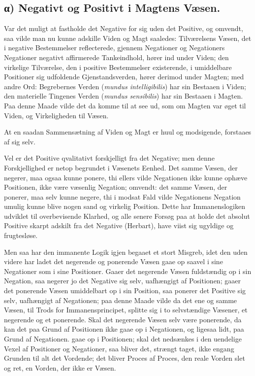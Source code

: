 \documentclass[12pt]{book}
\newcommand{\opage}[1]{\marginnote{\footnotesize\textit{[#1]}}}
\begin{document}
\subsection*{α) Negativt og Positivt i Magtens Væsen.}

Var det muligt at fastholde det Negative for sig uden det
Positive, og omvendt, saa vilde man nu kunne adskille Viden
og Magt saaledes: Tilværelsens Væsen, det i negative
Bestemmelser reflecterede, gjennem Negationer og Negationers
Negationer negativt affirmerede Tankeindhold, hører ind
under Viden; den virkelige Tilværelse, den i positive
Bestemmelser existerende, i umiddelbare Positioner sig
udfoldende Gjenstandsverden, hører derimod under Magten; med
andre Ord: Begrebernes Verden (\textit{mundus intelligibilis})
har sin Bestaaen i Viden; den materielle Tingenes Verden
(\textit{mundus sensibilis}) har sin Bestaaen i Magten. Paa
denne Maade vilde det da komme til at see ud, som om
Magten var øget til Viden, og Virkeligheden til Væsen.

At en saadan Sammensætning af Viden og Magt er
huul og modsigende, forstaaes af sig selv.

Vel er det Positive qvalitativt forskjelligt fra det
Negative; men denne Forskjellighed er netop begrundet i
Væsenets Eenhed. Det samme Væsen, der negerer, maa ogsaa
kunne ponere, thi ellers vilde Negationen ikke kunne ophæve
Positionen, ikke være væsenlig Negation; omvendt: det samme
Væsen, der ponerer, maa selv kunne negere, thi i modsat
Fald vilde Negationens Negation umulig kunne blive nogen
sand og virkelig Position. Dette har Immanenslogiken
udviklet til overbevisende Klarhed, og alle senere Forsøg paa
at holde det absolut Positive skarpt adskilt fra det Negative
(Herbart), have viist sig ugyldige og frugtesløse.

Men saa har den immanente Logik igjen begaaet et
stort Misgreb, idet den uden videre har ladet det negerende
og ponerende Væsen gaae op saavel i sine Negationer som
i sine Positioner. Gaaer det negerende Væsen fuldstændig
op i sin Negation, saa negerer jo det Negative sig selv,
uafhængigt af Positionen; gaaer det ponerende Væsen
umiddelbart op i sin Position, saa ponerer det Positive sig selv,
\opage{25} uafhængigt af Negationen; paa denne Maade vilde da det
ene og samme Væsen, til Trods for Immanensprincipet,
splitte sig i to selvstændige Væsener, et negerende og et
ponerende. Skal det negerende Væsen selv være ponerende,
da kan det paa Grund af Positionen ikke gaae op i
Negationen, og ligesaa lidt, paa Grund af Negationen. gaae op
i Positionen; skal det nedsænkes i den uendelige Vexel af
Positioner og Negationer, saa bliver det, strængt taget, ikke
engang Grunden til alt det Vordende; det bliver Proces
af Proces, den reale Vorden slet og ret, en Vorden, der
ikke er Væsen.
\end{document}
